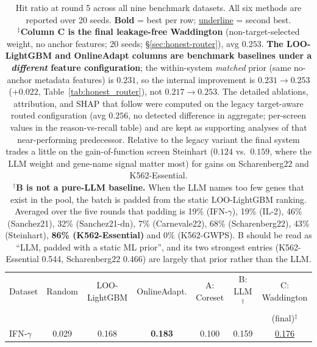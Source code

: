 \documentclass[11pt]{article}
\newcommand{\best}[1]{\textbf{#1}}
\newcommand{\second}[1]{\underline{#1}}
\begin{document}
\begin{table}[H]
\centering
\caption{%
  Hit ratio at round 5 across all nine benchmark datasets.
  All six methods are reported over 20 seeds.
  \textbf{Bold} = best per row; \underline{underline} = second best.
  \\[2pt]
  $^\ddagger$\textbf{Column C is the final leakage-free Waddington} (non-target-selected weight, no anchor
  features; 20 seeds; \S\ref{sec:honest-router}), avg $0.253$. \textbf{The LOO-LightGBM and OnlineAdapt
  columns are benchmark baselines under a \emph{different} feature configuration}; the within-system
  \emph{matched} prior (same no-anchor metadata features) is $0.231$, so the internal improvement is
  $0.231\!\rightarrow\!0.253$ ($+0.022$, Table~\ref{tab:honest_router}), not $0.217\!\rightarrow\!0.253$.
  The detailed ablations, attribution, and
  SHAP that follow were computed on the legacy target-aware routed configuration (avg $0.256$, no detected
  difference in aggregate; per-screen values in the reason-vs-recall table) and are kept as supporting
  analyses of that near-performing predecessor. Relative to the legacy variant the final system trades a
  little on the gain-of-function screen Steinhart ($0.124$ vs.\ $0.159$, where the LLM weight and gene-name
  signal matter most) for gains on Scharenberg22 and K562-Essential.
  \\[2pt]
  $^\dagger$\textbf{B is not a pure-LLM baseline.} When the LLM names too few genes that exist in the
  pool, the batch is padded from the static LOO-LightGBM ranking. Averaged over the five rounds that
  padding is 19\% (IFN-$\gamma$), 19\% (IL-2), 46\% (Sanchez21), 32\% (Sanchez21-dn),
  7\% (Carnevale22), 68\% (Scharenberg22), 43\% (Steinhart), \textbf{86\% (K562-Essential)} and
  0\% (K562-GWPS). B should be read as ``LLM, padded with a static ML prior'', and its two strongest
  entries (K562-Essential 0.544, Scharenberg22 0.466) are largely that prior rather than the LLM.
}
\label{tab:main}
\small
\setlength{\tabcolsep}{4.5pt}
\begin{tabular}{lcccccc}
\toprule
Dataset
  & Random
  & LOO-LightGBM
  & OnlineAdapt.
  & A: Coreset
  & B: LLM$^\dagger$
  & C: Waddington\\
  &&&&&& {\footnotesize (final)$^\ddagger$} \\
\midrule
IFN-$\gamma$   & 0.029 & 0.168 & \best{0.183} & 0.100 & 0.159 & \second{0.176} \\

\end{tabular}
\end{table}
\end{document}

